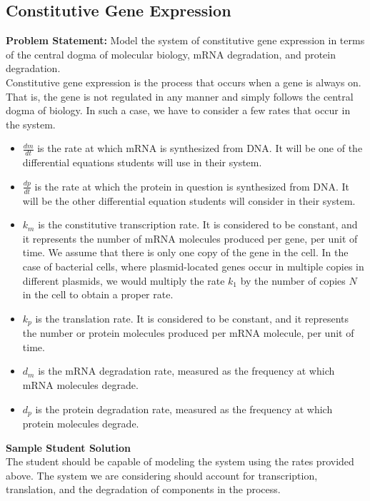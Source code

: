 \subsection{Constitutive Gene Expression}

\textbf{Problem Statement: } Model the system of constitutive gene expression in terms of the central dogma of molecular biology, mRNA degradation, and protein degradation.\\

Constitutive gene expression is the process that occurs when a gene is always on. That is, the gene is not regulated in any manner and simply follows the central dogma of biology. In such a case, we have to consider a few rates that occur in the system. 

\begin{itemize}
    \item $\frac{dm}{dt}$ is the rate at which mRNA is synthesized from DNA. It will be one of the differential equations students will use in their system.
    \item $\frac{dp}{dt}$ is the rate at which the protein in question is synthesized from DNA. It will be the other differential equation students will consider in their system.
    \item $k_{m}$ is the constitutive transcription rate. It is considered to be constant, and it represents the number of mRNA molecules produced per gene, per unit of time. We assume that there is only one copy of the gene in the cell. In the case of bacterial cells, where plasmid-located genes occur in multiple copies in different plasmids, we would multiply the rate $k_1$ by the number of copies $N$ in the cell to obtain a proper rate.
    \item $k_{p}$ is the translation rate. It is considered to be constant, and it represents the number or protein molecules produced per mRNA molecule, per unit of time.
    \item $d_{m}$ is the mRNA degradation rate, measured as the frequency at which mRNA molecules degrade.
    \item $d_{p}$ is the protein degradation rate, measured as the frequency at which protein molecules degrade.
\end{itemize}

\noindent \textbf{Sample Student Solution} \\

The student should be capable of modeling the system using the rates provided above. The system we are considering should account for transcription, translation, and the degradation of components in the process.

